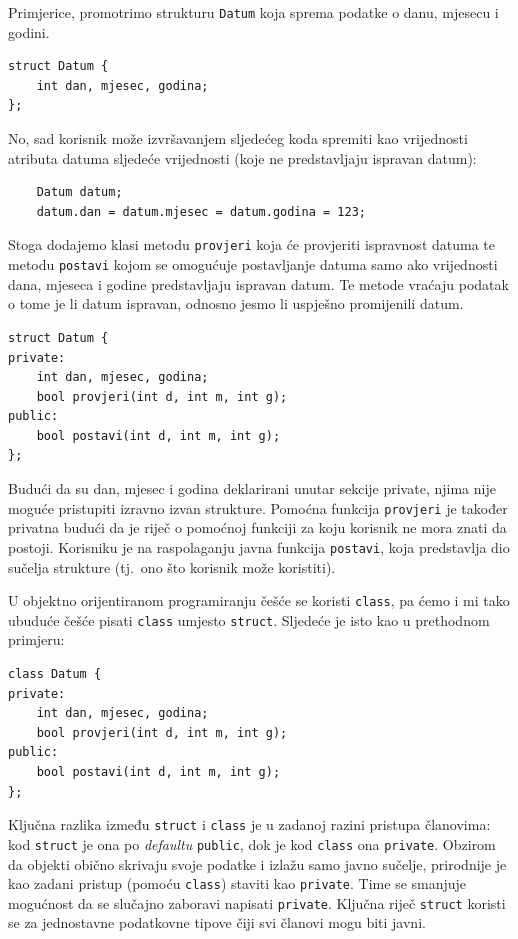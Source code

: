 Primjerice, promotrimo strukturu \texttt{Datum}
koja sprema podatke o danu, mjesecu i godini.
\begin{verbatim}
struct Datum {
    int dan, mjesec, godina;
};
\end{verbatim}
No, sad korisnik može izvršavanjem sljedećeg koda spremiti
kao vrijednosti atributa datuma sljedeće vrijednosti
(koje ne predstavljaju ispravan datum):
\begin{verbatim}
    Datum datum;
    datum.dan = datum.mjesec = datum.godina = 123;
\end{verbatim}
Stoga dodajemo klasi metodu \texttt{provjeri} koja će provjeriti ispravnost datuma
te metodu \texttt{postavi} kojom se omogućuje postavljanje datuma
samo ako vrijednosti dana, mjeseca i godine predstavljaju ispravan datum.
Te metode vraćaju podatak o tome je li datum ispravan,
odnosno jesmo li uspješno promijenili datum.
\begin{verbatim}
struct Datum {
private:
    int dan, mjesec, godina;
    bool provjeri(int d, int m, int g);
public:
    bool postavi(int d, int m, int g);
};
\end{verbatim}
Budući da su dan, mjesec i godina deklarirani unutar sekcije private, njima nije moguće pristupiti izravno izvan strukture.
Pomoćna funkcija \texttt{provjeri} je također privatna budući da je riječ o pomoćnoj funkciji
za koju korisnik ne mora znati da postoji. 
Korisniku je na raspolaganju javna funkcija \texttt{postavi},
koja predstavlja dio sučelja strukture
(tj.\ ono što korisnik može koristiti). 
\medskip

U objektno orijentiranom programiranju češće se koristi \texttt{class},
pa ćemo i mi tako ubuduće češće pisati \texttt{class}
umjesto \texttt{struct}.
Sljedeće je isto kao u prethodnom primjeru:
\begin{verbatim}
class Datum {
private:
    int dan, mjesec, godina;
    bool provjeri(int d, int m, int g);
public:
    bool postavi(int d, int m, int g);
};
\end{verbatim}
Ključna razlika između \texttt{struct} i \texttt{class} je u zadanoj razini pristupa članovima: 
kod \texttt{struct} je ona po \textit{defaultu} \texttt{public}, dok je kod \texttt{class} ona \texttt{private}.
Obzirom da objekti obično skrivaju svoje podatke i izlažu samo javno sučelje, prirodnije je kao zadani pristup (pomoću \texttt{class}) staviti kao \texttt{private}. Time se smanjuje mogućnost da se slučajno zaboravi napisati \texttt{private}.
Ključna riječ \texttt{struct} koristi se za jednostavne podatkovne tipove
čiji svi članovi mogu biti javni.


